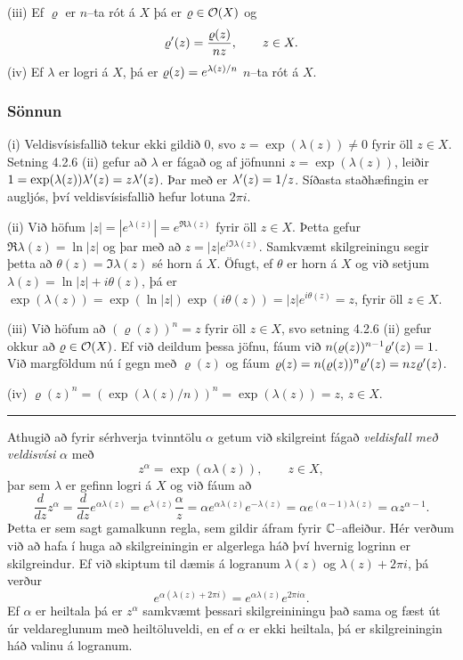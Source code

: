 \smallskip\noindent
(iii)  Ef $\varrho$ er $n$--ta rót á $X$ þá er $\varrho\in {\cal O}(X)$ og
 $$\varrho{\sp{\prime}}(z)=\frac {\varrho(z)}{nz}, \qquad z\in X.
 $$
(iv) Ef $\lambda$ er logri á $X$, þá er
$\varrho(z)=e\sp{\lambda(z)/n}$ $n$--ta rót á $X$.



\subsubsection{Sönnun} (i) Veldisvísisfallið tekur ekki gildið $0$, svo
$z=\exp(\lambda(z))\neq 0$ fyrir öll $z\in X$.  Setning 4.2.6 (ii)
gefur að $\lambda$ er fágað og af jöfnunni $z=\exp(\lambda(z))$,
leiðir $1=\exp(\lambda(z))\lambda{\sp{\prime}}(z)=z\lambda{\sp{\prime}}(z)$.  Þar með
er $\lambda{\sp{\prime}}(z)=1/z$.  Síðasta staðhæfingin er augljós, því
veldisvísisfallið hefur lotuna $2\pi i$.  

\smallskip
(ii) Við höfum $|z|=|e^{\lambda(z)}|=e^{\Re \lambda(z)}$ 
fyrir öll $z\in X$.  Þetta
gefur $\Re \lambda(z)=\ln |z|$ og þar með að $z=|z|e^{i\Im \lambda(z)}$. 
Samkvæmt skilgreiningu segir þetta að $\theta(z)=\Im\lambda(z)$
sé horn á $X$. Öfugt, ef $\theta$ er horn á $X$ og við setjum
$\lambda(z)=\ln |z|+i\theta(z)$, þá er
$\exp(\lambda(z))=\exp(\ln|z|)\exp(i\theta(z))=|z|e^{i\theta(z)}=z$,
fyrir öll $z\in X$.

\smallskip
(iii)  Við höfum að $(\varrho(z))^n=z$ fyrir öll $z\in X$, svo
setning 4.2.6 (ii) gefur okkur að $\varrho\in {\cal O}(X)$.  Ef við deildum
þessa jöfnu, fáum við $n(\varrho(z))^{n-1}\varrho{\sp{\prime}}(z)=1$.  Við
margföldum nú í gegn með $\varrho(z)$ og fáum 
$\varrho(z)=n(\varrho(z))^n\varrho{\sp{\prime}}(z)=nz\varrho{\sp{\prime}}(z)$.

\smallskip
(iv)   $\varrho(z)^n=(\exp(\lambda(z)/n))^n=\exp(\lambda(z))=z$, $z\in X$.




\bigskip\hrule\bigskip

Athugið að fyrir sérhverja tvinntölu ${\alpha}$ 
getum við skilgreint fágað {\it veldisfall með veldisvísi}
$\alpha$ með 
 $$z^\alpha=\exp(\alpha\lambda(z)), \qquad z\in X,
 $$
þar sem  $\lambda$ er gefinn logri á $X$ og við fáum að
 $$\dfrac d{dz}z^\alpha=\dfrac d{dz}e^{\alpha\lambda(z)}=e^{\lambda(z)}\frac
\alpha z =\alpha e^{\alpha\lambda(z)}e^{-\lambda(z)}=
\alpha e^{(\alpha-1)\lambda(z)}=\alpha z^{\alpha-1}.
 $$
Þetta er sem sagt gamalkunn regla, sem gildir áfram fyrir
${\mathbb C}$--afleiður.  Hér verðum við að hafa í huga að skilgreiningin  er
algerlega háð því hvernig logrinn er skilgreindur.  Ef við skiptum
til dæmis á logranum $\lambda(z)$ og $\lambda(z)+2\pi i$, þá verður 
 $$e^{\alpha(\lambda(z)+2\pi i)}=e^{\alpha\lambda(z)}e^{2\pi i\alpha}.
 $$
Ef $\alpha$ er heiltala þá er $z^\alpha$ samkvæmt þessari
skilgreininingu það sama og fæst út úr velda\-reglunum með
heiltöluveldi, en ef $\alpha$ er ekki heiltala, þá  er
skilgreiningin háð valinu á logranum.


